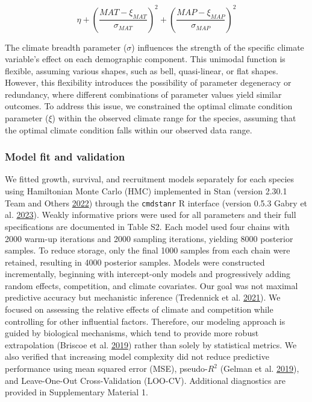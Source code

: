 \documentclass[12pt]{article}
\begin{document}
\begin{equation}
\eta + \left(\frac{MAT - \xi_{MAT}}{\sigma_{MAT}}\right)^2 + \left(\frac{MAP - \xi_{MAP}}{\sigma_{MAP}}\right)^2
\label{eq:climEffect}\end{equation}

The climate breadth parameter (\(\sigma\)) influences the strength of
the specific climate variable's effect on each demographic component.
This unimodal function is flexible, assuming various shapes, such as
bell, quasi-linear, or flat shapes. However, this flexibility introduces
the possibility of parameter degeneracy or redundancy, where different
combinations of parameter values yield similar outcomes. To address this
issue, we constrained the optimal climate condition parameter (\(\xi\))
within the observed climate range for the species, assuming that the
optimal climate condition falls within our observed data range.

\hypertarget{model-fit-and-validation}{%
\subsubsection{Model fit and
validation}\label{model-fit-and-validation}}

We fitted growth, survival, and recruitment models separately for each
species using Hamiltonian Monte Carlo (HMC) implemented in Stan (version
2.30.1 Team and Others \protect\hyperlink{ref-stan2022stan}{2022})
through the \texttt{cmdstanr} R interface (version 0.5.3 Gabry et al.
\protect\hyperlink{ref-cmdstanr}{2023}). Weakly informative priors were
used for all parameters and their full specifications are documented in
Table S2. Each model used four chains with 2000 warm-up iterations and
2000 sampling iterations, yielding 8000 posterior samples. To reduce
storage, only the final 1000 samples from each chain were retained,
resulting in 4000 posterior samples. Models were constructed
incrementally, beginning with intercept-only models and progressively
adding random effects, competition, and climate covariates. Our goal was
not maximal predictive accuracy but mechanistic inference (Tredennick et
al. \protect\hyperlink{ref-Tredennick2021}{2021}). We focused on
assessing the relative effects of climate and competition while
controlling for other influential factors. Therefore, our modeling
approach is guided by biological mechanisms, which tend to provide more
robust extrapolation (Briscoe et al.
\protect\hyperlink{ref-Briscoe2019}{2019}) rather than solely by
statistical metrics. We also verified that increasing model complexity
did not reduce predictive performance using mean squared error (MSE),
pseudo-\(R^2\) (Gelman et al. \protect\hyperlink{ref-Gelman2019}{2019}),
and Leave-One-Out Cross-Validation (LOO-CV). Additional diagnostics are
provided in Supplementary Material 1.
\end{document}
